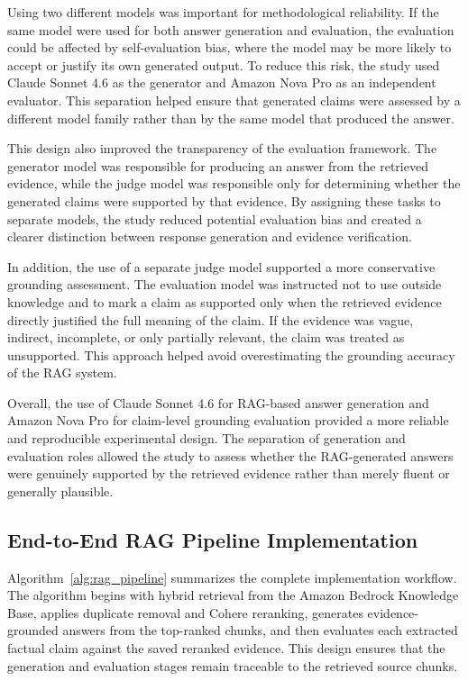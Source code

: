 Using two different models was important for methodological reliability. If the same model were used for both answer generation and evaluation, the evaluation could be affected by self-evaluation bias, where the model may be more likely to accept or justify its own generated output. To reduce this risk, the study used Claude Sonnet 4.6 as the generator and Amazon Nova Pro as an independent evaluator. This separation helped ensure that generated claims were assessed by a different model family rather than by the same model that produced the answer.

This design also improved the transparency of the evaluation framework. The generator model was responsible for producing an answer from the retrieved evidence, while the judge model was responsible only for determining whether the generated claims were supported by that evidence. By assigning these tasks to separate models, the study reduced potential evaluation bias and created a clearer distinction between response generation and evidence verification.

In addition, the use of a separate judge model supported a more conservative grounding assessment. The evaluation model was instructed not to use outside knowledge and to mark a claim as supported only when the retrieved evidence directly justified the full meaning of the claim. If the evidence was vague, indirect, incomplete, or only partially relevant, the claim was treated as unsupported. This approach helped avoid overestimating the grounding accuracy of the RAG system.

Overall, the use of Claude Sonnet 4.6 for RAG-based answer generation and Amazon Nova Pro for claim-level grounding evaluation provided a more reliable and reproducible experimental design. The separation of generation and evaluation roles allowed the study to assess whether the RAG-generated answers were genuinely supported by the retrieved evidence rather than merely fluent or generally plausible.

\subsection{End-to-End RAG Pipeline Implementation}
\label{subsec:end_to_end_pipeline}

Algorithm~\ref{alg:rag_pipeline} summarizes the complete implementation workflow. The algorithm begins with hybrid retrieval from the Amazon Bedrock Knowledge Base, applies duplicate removal and Cohere reranking, generates evidence-grounded answers from the top-ranked chunks, and then evaluates each extracted factual claim against the saved reranked evidence. This design ensures that the generation and evaluation stages remain traceable to the retrieved source chunks.

